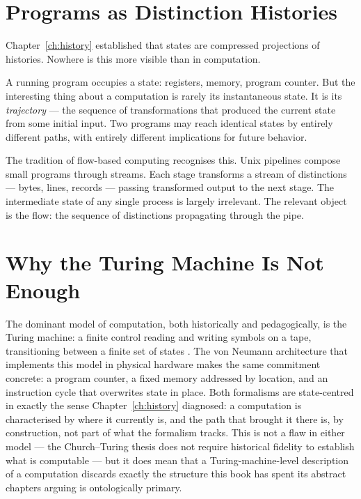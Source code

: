 \documentclass[12pt,twoside,openright]{book}
\begin{document}
\section{Programs as Distinction Histories}

Chapter~\ref{ch:history} established that states are
compressed projections of histories. Nowhere is this
more visible than in computation.

A running program occupies a state: registers, memory,
program counter. But the interesting thing about a
computation is rarely its instantaneous state. It is its
\emph{trajectory} — the sequence of transformations that
produced the current state from some initial input. Two
programs may reach identical states by entirely different
paths, with entirely different implications for future
behavior.

The tradition of flow-based computing recognises this.
Unix pipelines compose small programs through streams.
Each stage transforms a stream of distinctions — bytes,
lines, records — passing transformed output to the next
stage. The intermediate state of any single process is
largely irrelevant. The relevant object is the flow: the
sequence of distinctions propagating through the pipe.

\section{Why the Turing Machine Is Not Enough}
\label{sec:ch23-why-turing}

The dominant model of computation, both historically and
pedagogically, is the Turing machine: a finite control
reading and writing symbols on a tape, transitioning between
a finite set of states \parencite{turing1936}. The von Neumann
architecture that implements this model in physical hardware
makes the same commitment concrete: a program counter,
a fixed memory addressed by location, and an instruction
cycle that overwrites state in place. Both formalisms are
state-centred in exactly the sense Chapter~\ref{ch:history}
diagnosed: a computation is characterised by where it
currently is, and the path that brought it there is, by
construction, not part of what the formalism tracks. This is
not a flaw in either model --- the Church--Turing thesis does
not require historical fidelity to establish what is
computable --- but it does mean that a Turing-machine-level
description of a computation discards exactly the structure
this book has spent its abstract chapters arguing is
ontologically primary.
\end{document}
